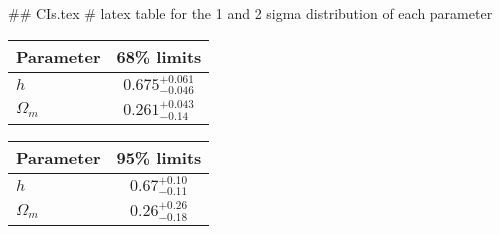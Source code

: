 ## CIs.tex
# latex table for the 1 and 2 sigma distribution of each parameter

\begin{tabular} { l  c}
 Parameter &  68\% limits\\
\hline
{\boldmath$h              $} & $0.675^{+0.061}_{-0.046}   $\\
{\boldmath$\Omega_m       $} & $0.261^{+0.043}_{-0.14}    $\\
\hline
\end{tabular}

\begin{tabular} { l  c}
 Parameter &  95\% limits\\
\hline
{\boldmath$h              $} & $0.67^{+0.10}_{-0.11}      $\\
{\boldmath$\Omega_m       $} & $0.26^{+0.26}_{-0.18}      $\\
\hline
\end{tabular}
